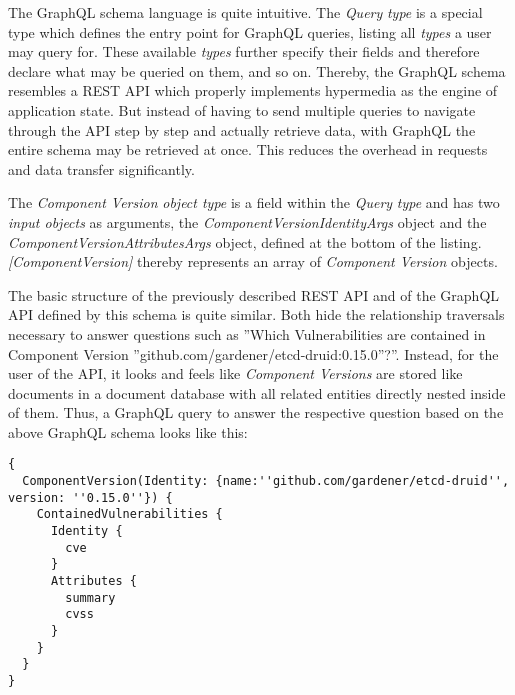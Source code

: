 The GraphQL schema language is quite intuitive. The \emph{Query} \emph{type} is a special type which defines the entry point for GraphQL queries, listing all \emph{types} a user may query for. These available \emph{types} further specify their fields and therefore declare what may be queried on them, and so on. Thereby, the GraphQL schema resembles a REST API which properly implements hypermedia as the engine of application state. But instead of having to send multiple queries to navigate through the API step by step and actually retrieve data, with GraphQL the entire schema may be retrieved at once. This reduces the overhead in requests and data transfer significantly.\par
The \emph{Component Version} \emph{object type} is a field within the \emph{Query} \emph{type} and has two \emph{ input objects} as arguments, the \emph{ComponentVersionIdentityArgs} object and the \emph{ComponentVersionAttributesArgs} object, defined at the bottom of the listing. \emph{[ComponentVersion]} thereby represents an array of \emph{Component Version} objects.\par 
The basic structure of the previously described REST API and of the GraphQL API defined by this schema is quite similar. Both hide the relationship traversals necessary to answer questions such as ''Which Vulnerabilities are contained in Component Version ''github.com/gardener/etcd-druid:0.15.0''?''. Instead, for the user of the API, it looks and feels like \emph{Component Versions} are stored like documents in a document database with all related entities directly nested inside of them. Thus, a GraphQL query to answer the respective question based on the above GraphQL schema looks like this:

\begin{lstlisting}[basicstyle=\tiny,  caption=GraphQL Query, captionpos=b, label=lst:GraphQLQuery]
{
  ComponentVersion(Identity: {name:''github.com/gardener/etcd-druid'', version: ''0.15.0''}) {
    ContainedVulnerabilities {
      Identity {
        cve
      }
      Attributes {
        summary
        cvss 
      }
    }
  }
}
\end{lstlisting}

